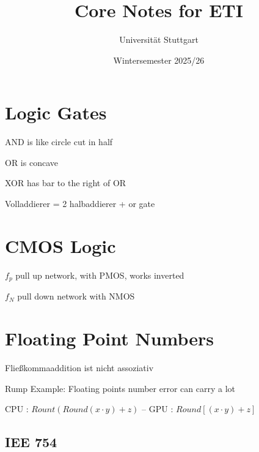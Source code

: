 \documentclass{article}
\begin{document}
\title{Core Notes for ETI}
\date{Wintersemester 2025/26}
\author{Universität Stuttgart}
\maketitle
\tableofcontents

\newpage
\section{Logic Gates}
AND is like circle cut in half

OR is concave

XOR has bar to the right of OR

Volladdierer = 2 halbaddierer + or gate

\section{CMOS Logic}
$f_p$ pull up network, with PMOS, works inverted

$f_N$ pull down network with NMOS




\section{Floating Point Numbers}
Fließkommaaddition ist nicht assoziativ

Rump Example: Floating points number error can carry a lot

CPU : $Rount(Round(x\cdot y)  + z)$ -- GPU : $Round[(x\cdot y ) + z]$

\subsection{IEE 754}
\end{document}
